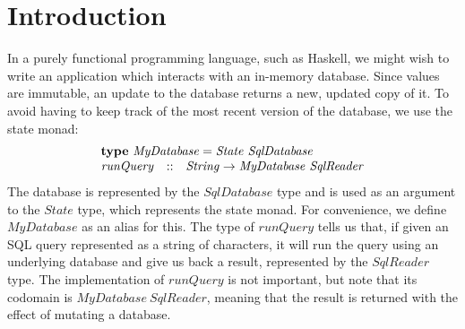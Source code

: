 \section{Introduction}
\label{sec:introduction}

In a purely functional programming language, such as Haskell, we might wish to write an application which interacts with an in-memory database. Since values are immutable, an update to the database returns a new, updated copy of it. To avoid having to keep track of the most recent version of the database, we use the state monad:
\begin{displaymath}
\begin{array}{lcl}
\multicolumn{3}{l}{\mathbf{type}~\mathit{MyDatabase} = \mathit{State}~\mathit{SqlDatabase}}\\
\mathit{runQuery} & :: & \mathit{String} \to \mathit{MyDatabase}~\mathit{SqlReader}
\end{array}
\end{displaymath}
The database is represented by the $\mathit{SqlDatabase}$ type and is used as an argument to the $\mathit{State}$ type, which represents the state monad. For convenience, we define $\mathit{MyDatabase}$ as an alias for this. The type of $\mathit{runQuery}$ tells us that, if given an SQL query represented as a string of characters, it will run the query using an underlying database and give us back a result, represented by the $\mathit{SqlReader}$ type.
The implementation of $\mathit{runQuery}$ is not important, but note that its codomain is $\mathit{MyDatabase}~\mathit{SqlReader}$, meaning that the result is returned with the effect of mutating a database. 

